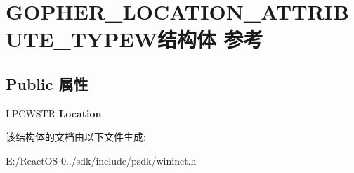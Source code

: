 \hypertarget{struct_g_o_p_h_e_r___l_o_c_a_t_i_o_n___a_t_t_r_i_b_u_t_e___t_y_p_e_w}{}\section{G\+O\+P\+H\+E\+R\+\_\+\+L\+O\+C\+A\+T\+I\+O\+N\+\_\+\+A\+T\+T\+R\+I\+B\+U\+T\+E\+\_\+\+T\+Y\+P\+E\+W结构体 参考}
\label{struct_g_o_p_h_e_r___l_o_c_a_t_i_o_n___a_t_t_r_i_b_u_t_e___t_y_p_e_w}
\subsection*{Public 属性}
\begin{DoxyCompactItemize}
\item 
\mbox{\label{struct_g_o_p_h_e_r___l_o_c_a_t_i_o_n___a_t_t_r_i_b_u_t_e___t_y_p_e_w_ac85561883ee2a179826218112e7fad88}} 
L\+P\+C\+W\+S\+TR {\bfseries Location}
\end{DoxyCompactItemize}


该结构体的文档由以下文件生成\+:\begin{DoxyCompactItemize}
\item 
E\+:/\+React\+O\+S-\/0../sdk/include/psdk/wininet.\+h\end{DoxyCompactItemize}
